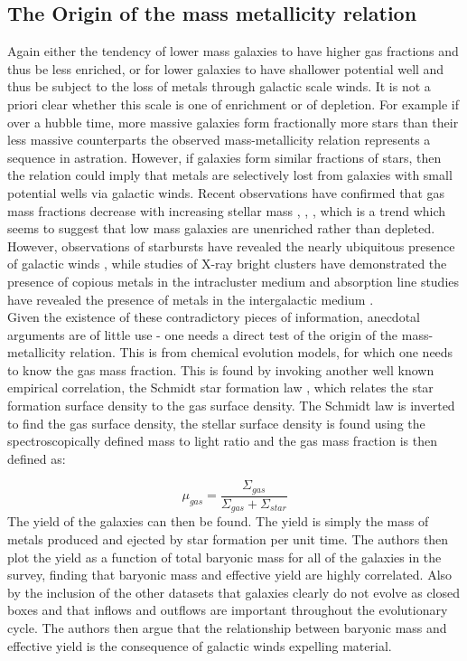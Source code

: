 \documentclass{literature}
\begin{document}
\subsection{The Origin of the mass metallicity relation}
Again either the tendency of lower mass galaxies to have higher gas fractions and thus be less enriched, or for lower galaxies to have shallower potential well and thus be subject to the loss of metals through galactic scale winds. It is not a priori clear whether this scale is one of enrichment or of depletion. For example if over a hubble time, more massive galaxies form fractionally more stars than their less massive counterparts the observed mass-metallicity relation represents a sequence in astration. However, if galaxies form similar fractions of stars, then the relation could imply that metals are selectively lost from galaxies with small potential wells via galactic winds. Recent observations have confirmed that gas mass fractions decrease with increasing stellar mass \citep{McGaugh_1997}, \citep{Bell_2000}, \citep{Boselli_2001}, which is a trend which seems to suggest that low mass galaxies are unenriched rather than depleted. However, observations of starbursts have revealed the nearly ubiquitous presence of galactic winds \citep{Heckman_2002}, while studies of X-ray bright clusters have demonstrated the presence of copious metals in the intracluster medium \citep{Gibson_1997} and absorption line studies have revealed the presence of metals in the intergalactic medium \citep{Ellison_2000}. \\ 
Given the existence of these contradictory pieces of information, anecdotal arguments are of little use - one needs a direct test of the origin of the mass-metallicity relation. This is from chemical evolution models, for which one needs to know the gas mass fraction. This is found by invoking another well known empirical correlation, the Schmidt star formation law \citep{Kennicutt_1998a}, which relates the star formation surface density to the gas surface density. The Schmidt law is inverted to find the gas surface density, the stellar surface density is found using the spectroscopically defined mass to light ratio and the gas mass fraction is then defined as: 

\begin{equation}
	\mu _{gas} = \frac{\Sigma _{gas}}{\Sigma _{gas} + \Sigma _{star}}
\end{equation}
The yield of the galaxies can then be found. The yield is simply the mass of metals produced and ejected by star formation per unit time. The authors then plot the yield as a function of total baryonic mass for all of the galaxies in the survey, finding that baryonic mass and effective yield are highly correlated. Also by the inclusion of the other datasets that galaxies clearly do not evolve as closed boxes and that inflows and outflows are important throughout the evolutionary cycle. The authors then argue that the relationship between baryonic mass and effective yield is the consequence of galactic winds expelling material. 
\end{document}
